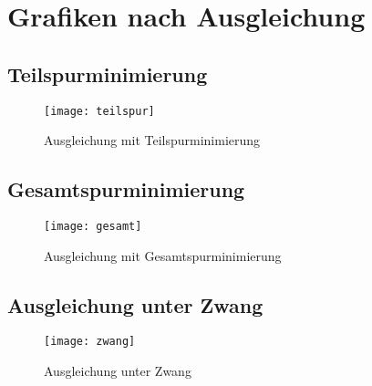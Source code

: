 \documentclass[12pt
,headinclude
,headsepline
,bibtotocnumbered
]{scrartcl}
\begin{document}
	\section{Grafiken nach Ausgleichung}
	\subsection{Teilspurminimierung}
	\begin{figure}[H]
		\centering
		\texttt{[image: teilspur]}
		\caption{Ausgleichung mit Teilspurminimierung}
	\end{figure}
\subsection{Gesamtspurminimierung}
\begin{figure}[H]
	\centering
	\texttt{[image: gesamt]}
	\caption{Ausgleichung mit Gesamtspurminimierung}
\end{figure}
\subsection{Ausgleichung unter Zwang}
\begin{figure}[H]
	\centering
	\texttt{[image: zwang]}
	\caption{Ausgleichung unter Zwang}
\end{figure}
\end{document}
